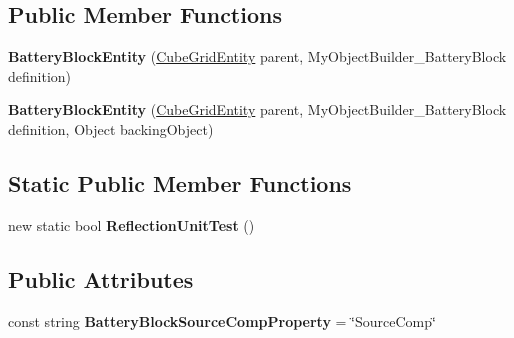 \subsection*{Public Member Functions}
\begin{DoxyCompactItemize}
\item 
\hypertarget{class_s_e_mod_a_p_i_internal_1_1_a_p_i_1_1_entity_1_1_sector_1_1_sector_object_1_1_cube_grid_1_1e3ae28049e4cb2ea762f188fbd81d368_aca2d7ba5578a41b8c5ed90265ba962cf}{}{\bfseries Battery\+Block\+Entity} (\hyperlink{class_s_e_mod_a_p_i_internal_1_1_a_p_i_1_1_entity_1_1_sector_1_1_sector_object_1_1_cube_grid_entity}{Cube\+Grid\+Entity} parent, My\+Object\+Builder\+\_\+\+Battery\+Block definition)\label{class_s_e_mod_a_p_i_internal_1_1_a_p_i_1_1_entity_1_1_sector_1_1_sector_object_1_1_cube_grid_1_1e3ae28049e4cb2ea762f188fbd81d368_aca2d7ba5578a41b8c5ed90265ba962cf}

\item 
\hypertarget{class_s_e_mod_a_p_i_internal_1_1_a_p_i_1_1_entity_1_1_sector_1_1_sector_object_1_1_cube_grid_1_1e3ae28049e4cb2ea762f188fbd81d368_a6359f3319d814b81d89d5cc52f014e1d}{}{\bfseries Battery\+Block\+Entity} (\hyperlink{class_s_e_mod_a_p_i_internal_1_1_a_p_i_1_1_entity_1_1_sector_1_1_sector_object_1_1_cube_grid_entity}{Cube\+Grid\+Entity} parent, My\+Object\+Builder\+\_\+\+Battery\+Block definition, Object backing\+Object)\label{class_s_e_mod_a_p_i_internal_1_1_a_p_i_1_1_entity_1_1_sector_1_1_sector_object_1_1_cube_grid_1_1e3ae28049e4cb2ea762f188fbd81d368_a6359f3319d814b81d89d5cc52f014e1d}

\end{DoxyCompactItemize}
\subsection*{Static Public Member Functions}
\begin{DoxyCompactItemize}
\item 
\hypertarget{class_s_e_mod_a_p_i_internal_1_1_a_p_i_1_1_entity_1_1_sector_1_1_sector_object_1_1_cube_grid_1_1e3ae28049e4cb2ea762f188fbd81d368_a12fc538630f3b87640e4f9734d46595f}{}new static bool {\bfseries Reflection\+Unit\+Test} ()\label{class_s_e_mod_a_p_i_internal_1_1_a_p_i_1_1_entity_1_1_sector_1_1_sector_object_1_1_cube_grid_1_1e3ae28049e4cb2ea762f188fbd81d368_a12fc538630f3b87640e4f9734d46595f}

\end{DoxyCompactItemize}
\subsection*{Public Attributes}
\begin{DoxyCompactItemize}
\item 
\hypertarget{class_s_e_mod_a_p_i_internal_1_1_a_p_i_1_1_entity_1_1_sector_1_1_sector_object_1_1_cube_grid_1_1e3ae28049e4cb2ea762f188fbd81d368_af58e7f38266ac57441d546791764939b}{}const string {\bfseries Battery\+Block\+Source\+Comp\+Property} = \char`\"{}Source\+Comp\char`\"{}\label{class_s_e_mod_a_p_i_internal_1_1_a_p_i_1_1_entity_1_1_sector_1_1_sector_object_1_1_cube_grid_1_1e3ae28049e4cb2ea762f188fbd81d368_af58e7f38266ac57441d546791764939b}

\end{DoxyCompactItemize}
